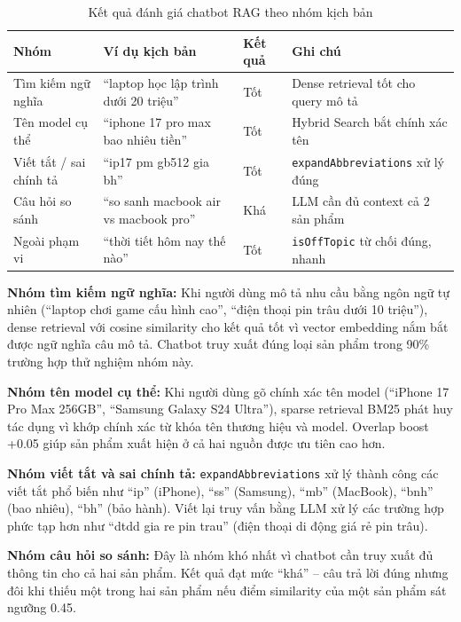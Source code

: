 \begin{table}[H]
  \centering
  \caption{Kết quả đánh giá chatbot RAG theo nhóm kịch bản}
  \label{tab:rag_scenarios}
  \footnotesize
  \begin{tabular}{|p{2.8cm}|p{4cm}|p{1.4cm}|p{4.5cm}|}
    \hline
    \textbf{Nhóm} & \textbf{Ví dụ kịch bản} & \textbf{Kết quả} & \textbf{Ghi chú} \\
    \hline
    Tìm kiếm ngữ nghĩa & ``laptop học lập trình dưới 20 triệu'' & Tốt & Dense retrieval tốt cho query mô tả \\
    \hline
    Tên model cụ thể & ``iphone 17 pro max bao nhiêu tiền'' & Tốt & Hybrid Search bắt chính xác tên \\
    \hline
    Viết tắt / sai chính tả & ``ip17 pm gb512 gia bh'' & Tốt & \texttt{expandAbbreviations} xử lý đúng \\
    \hline
    Câu hỏi so sánh & ``so sanh macbook air vs macbook pro'' & Khá & LLM cần đủ context cả 2 sản phẩm \\
    \hline
    Ngoài phạm vi & ``thời tiết hôm nay thế nào'' & Tốt & \texttt{isOffTopic} từ chối đúng, nhanh \\
    \hline
  \end{tabular}
  \normalsize
\end{table}

\textbf{Nhóm tìm kiếm ngữ nghĩa:} Khi người dùng mô tả nhu cầu bằng ngôn ngữ tự nhiên (``laptop chơi game cấu hình cao'', ``điện thoại pin trâu dưới 10 triệu''), dense retrieval với cosine similarity cho kết quả tốt vì vector embedding nắm bắt được ngữ nghĩa câu mô tả. Chatbot truy xuất đúng loại sản phẩm trong 90\% trường hợp thử nghiệm nhóm này.

\textbf{Nhóm tên model cụ thể:} Khi người dùng gõ chính xác tên model (``iPhone 17 Pro Max 256GB'', ``Samsung Galaxy S24 Ultra''), sparse retrieval BM25 phát huy tác dụng vì khớp chính xác từ khóa tên thương hiệu và model. Overlap boost +0.05 giúp sản phẩm xuất hiện ở cả hai nguồn được ưu tiên cao hơn.

\textbf{Nhóm viết tắt và sai chính tả:} \texttt{expandAbbreviations} xử lý thành công các viết tắt phổ biến như ``ip'' (iPhone), ``ss'' (Samsung), ``mb'' (MacBook), ``bnh'' (bao nhiêu), ``bh'' (bảo hành). Viết lại truy vấn bằng LLM xử lý các trường hợp phức tạp hơn như ``dtdd gia re pin trau'' (điện thoại di động giá rẻ pin trâu).

\textbf{Nhóm câu hỏi so sánh:} Đây là nhóm khó nhất vì chatbot cần truy xuất đủ thông tin cho cả hai sản phẩm. Kết quả đạt mức ``khá'' -- câu trả lời đúng nhưng đôi khi thiếu một trong hai sản phẩm nếu điểm similarity của một sản phẩm sát ngưỡng 0.45.

